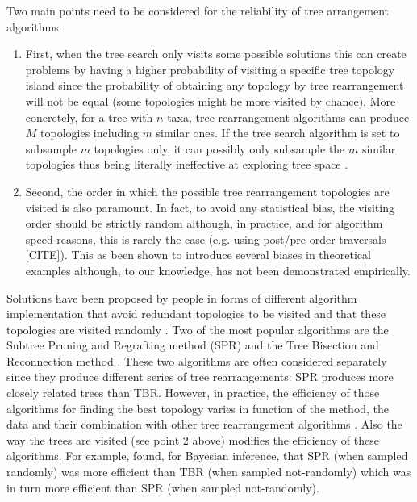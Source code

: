 \documentclass[12pt,letterpaper]{article}
\begin{document}
Two main points need to be considered for the reliability of tree arrangement algorithms:
\begin{enumerate}
    \item First, when the tree search only visits some possible solutions this can create problems by having a higher probability of visiting a specific tree topology island since the probability of obtaining any topology by tree rearrangement will not be equal (some topologies might be more visited by chance).
    More concretely, for a tree with $n$ taxa, tree rearrangement algorithms can produce $M$ topologies including $m$ similar ones.
    If the tree search algorithm is set to subsample $m$ topologies only, it can possibly only subsample the $m$ similar topologies thus being literally ineffective at exploring tree space \citep{allen2001subtree}.
    \item Second, the order in which the possible tree rearrangement topologies are visited is also paramount.
    In fact, to avoid any statistical bias, the visiting order should be strictly random \citep{goloboff2014bias} although, in practice, and for algorithm speed reasons, this is rarely the case (e.g. using post/pre-order traversals [CITE]).
    This as been shown to introduce several biases in theoretical examples \citep{goloboff2014bias} although, to our knowledge, has not been demonstrated empirically.
\end{enumerate}

Solutions have been proposed by people in forms of different algorithm implementation that avoid redundant topologies to be visited \citep{allen2001subtree} and that these topologies are visited randomly \citep{goloboff2014bias}.
Two of the most popular algorithms are the Subtree Pruning and Regrafting method (SPR) and the Tree Bisection and Reconnection method \citep[TBR - see Fig. \ref{Figure_SPR} and \ref{Figure_TBR} and text below for detailled description;][]{allen2001subtree,felsenstein2004inferring}.
These two algorithms are often considered separately since they produce different series of tree rearrangements: SPR produces more closely related trees than TBR.
However, in practice, the efficiency of those algorithms for finding the best topology varies in function of the method, the data and their combination with other tree rearrangement algorithms \citep[e.g.][]{morrison2007increasing,lakner2008efficiency}.
Also the way the trees are visited (see point 2 above) modifies the efficiency of these algorithms.
For example, \cite{lakner2008efficiency} found, for Bayesian inference, that SPR (when sampled randomly) was more efficient than TBR (when sampled not-randomly) which was in turn more efficient than SPR (when sampled not-randomly).
\end{document}
